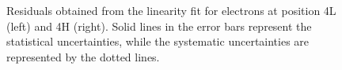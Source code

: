 %
\begin{figure}[htb]
\begin{center}
\end{center}
\caption{Residuals obtained from the linearity fit for electrons at position 4L (left) and 4H (right). Solid lines in the error bars represent the statistical uncertainties, while the systematic uncertainties are represented by the dotted lines. }
\label{TBplot_electron_residuals}
\end{figure}



